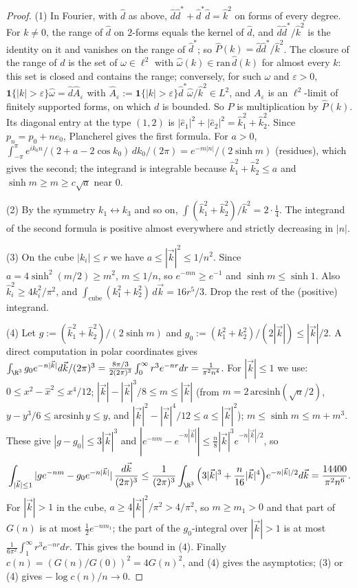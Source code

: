 \begin{proof}
(1) In Fourier, with $\hat d$ as above, $\hat d\hat d^*+\hat d^*\hat d=\hat k^2$ on forms of every degree. For $k\ne0$, the range of $\hat d$ on $2$-forms equals the kernel of $\hat d$, and $\hat d\hat d^*/\hat k^2$ is the identity on it and vanishes on the range of $\hat d^*$; so $\hat P(k)=\hat d\hat d^*/\hat k^2$. The closure of the range of $d$ is the set of $\omega\in\ell^2$ with $\hat\omega(k)\in\mathrm{ran}\,\hat d(k)$ for almost every $k$: this set is closed and contains the range; conversely, for such $\omega$ and $\varepsilon>0$, $\mathbf 1\{|k|>\varepsilon\}\hat\omega=\hat d\hat A_\varepsilon$ with $\hat A_\varepsilon:=\mathbf 1\{|k|>\varepsilon\}\hat d^*\hat\omega/\hat k^2\in L^2$, and $A_\varepsilon$ is an $\ell^2$-limit of finitely supported forms, on which $d$ is bounded. So $P$ is multiplication by $\hat P(k)$. Its diagonal entry at the type $(1,2)$ is $|\hat e_1|^2+|\hat e_2|^2=\hat k_1^2+\hat k_2^2$. Since $p_n=p_0+ne_0$, Plancherel gives the first formula. For $a>0$, $\int_{-\pi}^\pi e^{ik_0n}/(2+a-2\cos k_0)\,dk_0/(2\pi)=e^{-m|n|}/(2\sinh m)$ (residues), which gives the second; the integrand is integrable because $\hat k_1^2+\hat k_2^2\le a$ and $\sinh m\ge m\ge c\sqrt a$ near $0$.

(2) By the symmetry $k_1\leftrightarrow k_3$ and so on, $\int(\hat k_1^2+\hat k_2^2)/\hat k^2=2\cdot\frac14$. The integrand of the second formula is positive almost everywhere and strictly decreasing in $|n|$.

(3) On the cube $|k_i|\le r$ we have $a\le|\vec k|^2\le1/n^2$. Since $a=4\sinh^2(m/2)\ge m^2$, $m\le1/n$, so $e^{-mn}\ge e^{-1}$ and $\sinh m\le\sinh1$. Also $\hat k_i^2\ge4k_i^2/\pi^2$, and $\int_{\text{cube}}(k_1^2+k_2^2)\,d\vec k=16r^5/3$. Drop the rest of the (positive) integrand.

(4) Let $g:=(\hat k_1^2+\hat k_2^2)/(2\sinh m)$ and $g_0:=(k_1^2+k_2^2)/(2|\vec k|)\le|\vec k|/2$. A direct computation in polar coordinates gives $\int_{\R^3}g_0e^{-n|\vec k|}d\vec k/(2\pi)^3=\frac{8\pi/3}{2(2\pi)^3}\int_0^\infty r^3e^{-nr}dr=\frac1{\pi^2n^4}$. For $|\vec k|\le1$ we use: $0\le x^2-\hat x^2\le x^4/12$; $|\vec k|-|\vec k|^3/8\le m\le|\vec k|$ (from $m=2\,\mathrm{arcsinh}(\sqrt a/2)$, $y-y^3/6\le\mathrm{arcsinh}\,y\le y$, and $|\vec k|^2-|\vec k|^4/12\le a\le|\vec k|^2$); $m\le\sinh m\le m+m^3$. These give $|g-g_0|\le3|\vec k|^3$ and $|e^{-nm}-e^{-n|\vec k|}|\le\frac n8|\vec k|^3e^{-n|\vec k|/2}$, so
\[
\int_{|\vec k|\le1}|ge^{-nm}-g_0e^{-n|\vec k|}|\,\frac{d\vec k}{(2\pi)^3}\le\frac1{(2\pi)^3}\int_{\R^3}\Big(3|\vec k|^3+\frac n{16}|\vec k|^4\Big)e^{-n|\vec k|/2}d\vec k=\frac{14400}{\pi^2n^6}.
\]
For $|\vec k|>1$ in the cube, $a\ge4|\vec k|^2/\pi^2>4/\pi^2$, so $m\ge m_1>0$ and that part of $G(n)$ is at most $\tfrac12e^{-nm_1}$; the part of the $g_0$-integral over $|\vec k|>1$ is at most $\frac1{6\pi^2}\int_1^\infty r^3e^{-nr}dr$. This gives the bound in (4). Finally $c(n)=(G(n)/G(0))^2=4G(n)^2$, and (4) gives the asymptotics; (3) or (4) gives $-\log c(n)/n\to0$.
\end{proof}

